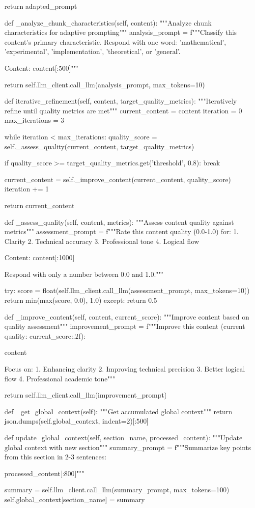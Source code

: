         return adapted_prompt
    
    def _analyze_chunk_characteristics(self, content):
        """Analyze chunk characteristics for adaptive prompting"""
        analysis_prompt = f"""Classify this content's primary characteristic. Respond with one word: 'mathematical', 'experimental', 'implementation', 'theoretical', or 'general'.

Content: {content[:500]}"""
        
        return self.llm_client.call_llm(analysis_prompt, max_tokens=10)
    
    def iterative_refinement(self, content, target_quality_metrics):
        """Iteratively refine until quality metrics are met"""
        current_content = content
        iteration = 0
        max_iterations = 3
        
        while iteration < max_iterations:
            quality_score = self._assess_quality(current_content, target_quality_metrics)
            
            if quality_score >= target_quality_metrics.get('threshold', 0.8):
                break
            
            current_content = self._improve_content(current_content, quality_score)
            iteration += 1
        
        return current_content
    
    def _assess_quality(self, content, metrics):
        """Assess content quality against metrics"""
        assessment_prompt = f"""Rate this content quality (0.0-1.0) for:
1. Clarity
2. Technical accuracy
3. Professional tone
4. Logical flow

Content: {content[:1000]}

Respond with only a number between 0.0 and 1.0."""
        
        try:
            score = float(self.llm_client.call_llm(assessment_prompt, max_tokens=10))
            return min(max(score, 0.0), 1.0)
        except:
            return 0.5
    
    def _improve_content(self, content, current_score):
        """Improve content based on quality assessment"""
        improvement_prompt = f"""Improve this content (current quality: {current_score:.2f}):

{content}

Focus on:
1. Enhancing clarity
2. Improving technical precision
3. Better logical flow
4. Professional academic tone"""
        
        return self.llm_client.call_llm(improvement_prompt)
    
    def _get_global_context(self):
        """Get accumulated global context"""
        return json.dumps(self.global_context, indent=2)[:500]
    
    def update_global_context(self, section_name, processed_content):
        """Update global context with new section"""
        summary_prompt = f"""Summarize key points from this section in 2-3 sentences:

{processed_content[:800]}"""
        
        summary = self.llm_client.call_llm(summary_prompt, max_tokens=100)
        self.global_context[section_name] = summary